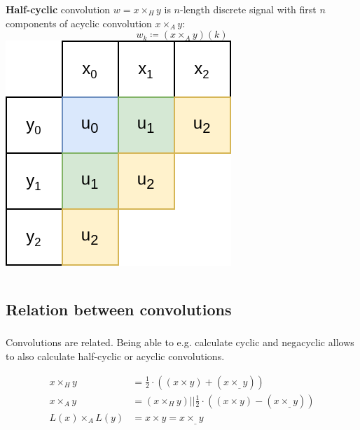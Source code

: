 \documentclass{beamer}
\begin{document}
\begin{frame}
		\frametitle{\secname}
		\framesubtitle{\subsecname}

 		\begin{columns}
				\textbf{Half-cyclic} convolution $w = x \times_H y$ is $n$-length discrete
				signal with first $n$ components of acyclic convolution $x \times_A y$:
				\[
						w_k \coloneqq (x \times_A y)(k)
				\]
 				\includegraphics[width=\textwidth]{../resources/halfcyclic_convolution.drawio.png}
		\end{columns}
\end{frame}

\subsection{Relation between convolutions}

\begin{frame}
		\frametitle{\secname}
		\framesubtitle{\subsecname}

		Convolutions are related. Being able to e.g. calculate cyclic and
		negacyclic allows to also calculate half-cyclic or acyclic
		convolutions.

		\begin{align*}
				x \times_H y & = \frac{1}{2} \cdot ((x \times y) + (x \times_{\_} y)) \\
				x \times_A y & = (x \times_H y) || \frac{1}{2} \cdot ((x \times y) - (x \times_{\_} y)) \\
				L(x) \times_A L(y) & = x \times y = x \times_{\_} y
		\end{align*}
\end{frame}
\end{document}
